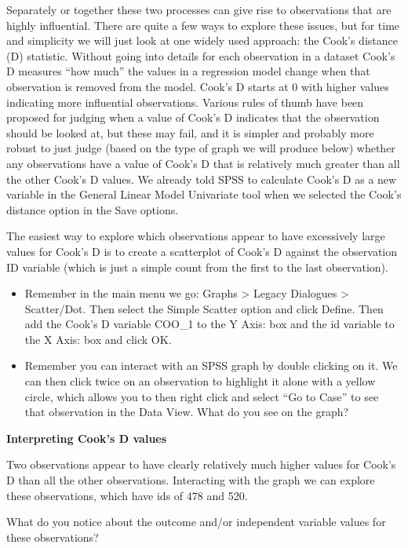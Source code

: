 \documentclass[
]{book}
\begin{document}
Separately or together these two processes can give rise to observations that are highly influential. There are quite a few ways to explore these issues, but for time and simplicity we will just look at one widely used approach: the Cook's distance (D) statistic. Without going into details for each observation in a dataset Cook's D measures ``how much'' the values in a regression model change when that observation is removed from the model. Cook's D starts at 0 with higher values indicating more influential observations. Various rules of thumb have been proposed for judging when a value of Cook's D indicates that the observation should be looked at, but these may fail, and it is simpler and probably more robust to just judge (based on the type of graph we will produce below) whether any observations have a value of Cook's D that is relatively much greater than all the other Cook's D values. We already told SPSS to calculate Cook's D as a new variable in the General Linear Model Univariate tool when we selected the Cook's distance option in the Save options.

The easiest way to explore which observations appear to have excessively large values for Cook's D is to create a scatterplot of Cook's D against the observation ID variable (which is just a simple count from the first to the last observation).

\begin{itemize}
\item
  Remember in the main menu we go: Graphs \textgreater{} Legacy Dialogues \textgreater{} Scatter/Dot. Then select the Simple Scatter option and click Define. Then add the Cook's D variable COO\_1 to the Y Axis: box and the id variable to the X Axis: box and click OK.
\item
  Remember you can interact with an SPSS graph by double clicking on it. We can then click twice on an observation to highlight it alone with a yellow circle, which allows you to then right click and select ``Go to Case'' to see that observation in the Data View. What do you see on the graph?
\end{itemize}

\textbf{Interpreting Cook's D values}

Two observations appear to have clearly relatively much higher values for Cook's D than all the other observations. Interacting with the graph we can explore these observations, which have ids of 478 and 520.

What do you notice about the outcome and/or independent variable values for these observations?
\end{document}
